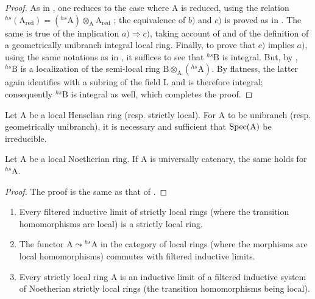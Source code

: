 \begin{proof}
As in , one reduces to the case where A is reduced, using the relation ${}^{hs}(\mathrm{A}_{\mathrm{red}})=({}^{hs}\!\mathrm{A})\otimes_{\mathrm{A}}\mathrm{A}_{\mathrm{red}}$ ; the equivalence of $b)$ and $c)$ is proved as in .  The same is true of the implication $a)\Rightarrow c)$, taking account of  and of the definition of a geometrically unibranch integral local ring.
Finally, to prove that $c)$ implies $a)$, using the same notations as in , it suffices to see that ${}^{hs}\!\mathrm{B}$ is integral.
But, by , ${}^{hs}\!\mathrm{B}$ is a localization of the semi-local ring $\mathrm{B}\otimes_{\mathrm{A}}({}^{hs}\!\mathrm{A})$.  By flatness, the latter again identifies with a subring of the field L and is therefore integral; consequently ${}^{hs}\!\mathrm{B}$ is integral as well, which completes the proof.
\end{proof}

\begin{corollary}[18.8.16]
\label{IV.18.8.16}
Let $\mathrm{A}$ be a local Henselian ring (resp. strictly local).
For A to be unibranch (resp. geometrically unibranch), it is necessary and sufficient that $\operatorname{Spec}(\mathrm{A})$ be irreducible.
\end{corollary}


\begin{proposition}[18.8.17]
\label{IV.18.8.17}
Let $\mathrm{A}$ be a local Noetherian ring.
If A is universally catenary, the same holds for ${}^{hs}\!\mathrm{A}$.
\end{proposition}

\begin{proof}
The proof is the same as that of .
\end{proof}

\begin{proposition}[18.8.18]
\label{IV.18.8.18}
\begin{enumerate}[label=\emph{\roman*)}]
  \item Every filtered inductive limit of strictly local rings (where the transition homomorphisms are local) is a strictly local ring.
  \item The functor $\mathrm{A}\leadsto{}^{hs}\!\mathrm{A}$ in the category of local rings (where the morphisms are local homomorphisms) commutes with filtered inductive limits.
  \item Every strictly local ring A is an inductive limit of a filtered inductive system of Noetherian strictly local rings (the transition homomorphisms being local).
\end{enumerate}
\end{proposition}

